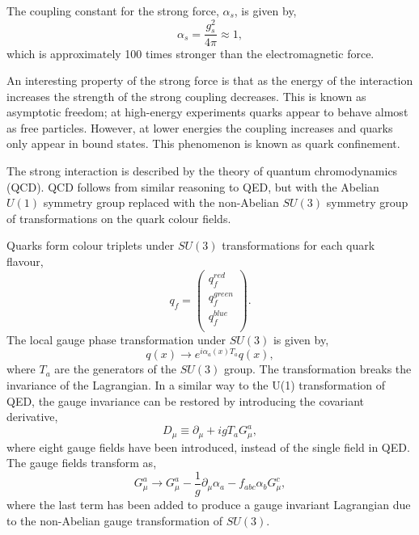 The coupling constant for the strong force, $\alpha_s$, is given by,
\begin{equation}
\alpha_s = \frac{g_s^2}{4 \pi} \approx 1,
\end{equation}
which is approximately 100 times stronger than the {electromagnetic} force.

An interesting property of the strong force is that as the energy of the interaction
increases the strength of the strong coupling decreases. This is known as
asymptotic freedom; at high-energy experiments quarks appear to behave almost as
free particles. However, at lower energies the coupling increases and quarks
only appear in bound states. This phenomenon is known as quark confinement. 

The strong interaction is described by the theory of quantum chromodynamics
(QCD). QCD follows from similar reasoning to {QED}, but with
the Abelian $U(1)$ symmetry group replaced with the non-Abelian $SU(3)$ symmetry
group of transformations on the quark colour fields.

Quarks form colour triplets under $SU(3)$ transformations for each quark
flavour,
\begin{equation}
q_{f} =
\left(\begin{matrix} 
q^{red}_{f} \\
q^{green}_{f} \\
q^{blue}_{f} \\
\end{matrix} \right).
\end{equation}
The local gauge phase transformation under $SU(3)$ is given by,
\begin{equation}
q(x) \to e^{i\alpha_a(x)T_a} q(x),
\end{equation}
where $T_a$ are the generators of the $SU(3)$ group. The transformation breaks
the invariance of the Lagrangian. In a similar way to the U(1) transformation of
QED, the gauge invariance can be restored by introducing the covariant
derivative,
\begin{equation}
D_{\mu} \equiv \partial_{\mu} + i g T_{a} G_{\mu}^{a},
\end{equation}
where eight gauge fields have been introduced, instead of the single field in
QED.  The gauge fields transform as,
\begin{equation}
 G_{\mu}^{a} \to G_{\mu}^{a} 
-\frac{1}{g}\partial_{\mu}\alpha_{a}
-f_{abc}\alpha_{b}G^{c}_{\mu},
\end{equation}
where the last term has been added to produce a gauge invariant
Lagrangian due to the non-Abelian gauge transformation of $SU(3)$.

